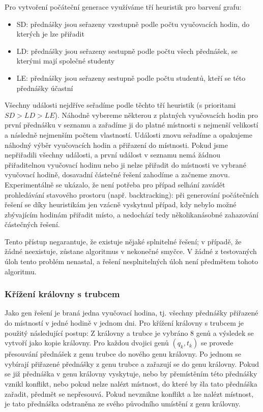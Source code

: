\documentclass[12pt, a4paper]{article}
\begin{document}
Pro vytvoření počáteční generace využíváme tří heuristik pro barvení grafu:
\begin{itemize}
  \item SD: přednášky jsou seřazeny vzestupně podle počtu vyučovacích hodin, do kterých je lze přiřadit
  \item LD: přednášky jsou seřazeny sestupně podle počtu všech přednášek, se kterými mají společné studenty
  \item LE: přednášky jsou seřazeny sestupně podle počtu studentů, kteří se této přednášky účastní
\end{itemize}
Všechny události nejdříve seřadíme podle těchto tří heuristik (s prioritami $SD > LD > LE$). Náhodně vybereme některou z platných vyučovacích hodin pro první přednášku v seznamu a zařadíme
ji do platné místnosti s nejmenší velikostí a následně nejmenším počtem vlastností.
Události znovu seřadíme a opakujeme náhodný výběr vyučovacích hodin a přiřazení do místnosti.
Pokud jsme nepřiřadili všechny události, a první událost v seznamu nemá žádnou přiřaditelnou vyučovací hodinu nebo ji nelze přiřadit do místnosti ve vybrané vyučovací hodině, dosavadní částečné řešení
zahodíme a začneme znovu.
Experimentálně se ukázalo, že není potřeba pro případ selhání zavádět prohledávání stavového prostoru (např. backtracking):
při generování počátečních řešení se díky heuristikám jen vzácně vyskytnul případ, kdy nebylo možné zbývajícím hodinám přiřadit místo,
a nedochází tedy několikanásobné zahazování částečných řešení.

Tento přístup negarantuje, že existuje nějaké splnitelné řešení; v případě, že žádné neexistuje, zůstane algoritmus v nekonečné smyčce.
V žádné z testovaných úloh tento problém nenastal, a řešení nesplnitelných úloh není předmětem tohoto algoritmu.

\subsubsection{Křížení královny s trubcem}
Jako gen řešení je braná jedna vyučovací hodina, tj. všechny přednášky přiřazené do místností v jedné hodině v jednom dni.
Pro křížení královny s trubcem je použitý následující postup:
Z královny a trubce je vybráno 8 genů a výsledek se vytvoří jako kopie královny.
Pro každou dvojici genů $(q_k, t_k)$ se provede přesouvání přednášek z genu trubce do nového genu královny.
Po jednom se vybírají přiřazené přednášky z genu trubce a zařazují se do genu královny.
Pokud se již přednáška v genu královny vyskytuje, nebo by přemístěním této přednášky vznikl konflikt, nebo pokud nelze nalézt místnost, do které by šla tato přednáška zařadit,
předmět se nepřesouvá. Pokud nevznikne konflikt a lze nalézt místnost, je tato přednáška odstraněna ze svého původního umístění z genu královny.
\end{document}
